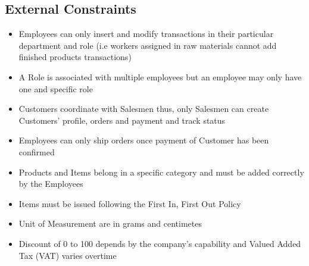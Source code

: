 \subsection{External Constraints}
\begin{itemize}
\item Employees can only insert and modify transactions in their particular department and role (i.e workers assigned in raw materials cannot add finished products transactions)
\item A Role is associated with multiple employees but an employee may only have one and specific role
\item Customers coordinate with Salesmen thus, only Salesmen can create Customers' profile, orders and payment and track status
\item Employees can only ship orders once payment of Customer has been confirmed
\item Products and Items belong in a specific category and must be added correctly by the Employees
\item Items must be issued following the First In, First Out Policy
\item Unit of Measurement are in grams and centimetes
\item Discount of 0 to 100 depends by the company's capability and Valued Added Tax (VAT) varies overtime
\end{itemize}